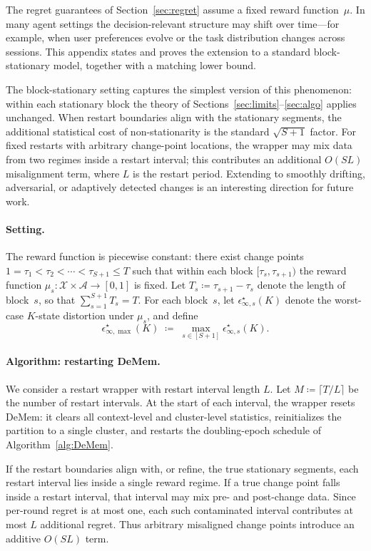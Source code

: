 \documentclass{article}
\theoremstyle{plain}
\theoremstyle{definition}
\theoremstyle{remark}
\newcommand{\cA}{\mathcal{A}}
\newcommand{\cX}{\mathcal{X}}
\newcommand{\eps}{\epsilon}
\begin{document}
The regret guarantees of Section~\ref{sec:regret} assume a fixed reward
function~$\mu$.
In many agent settings the decision-relevant structure may shift over
time---for example, when user preferences evolve or the task distribution
changes across sessions.
This appendix states and proves the extension to a standard block-stationary
model, together with a matching lower bound.

The block-stationary setting captures the simplest version of this phenomenon:
within each stationary block the theory of
Sections~\ref{sec:limits}--\ref{sec:algo} applies unchanged.
When restart boundaries align with the stationary segments, the additional
statistical cost of non-stationarity is the standard \(\sqrt{S+1}\) factor.
For fixed restarts with arbitrary change-point locations, the wrapper may mix
data from two regimes inside a restart interval; this contributes an
additional \(O(SL)\) misalignment term, where \(L\) is the restart period.
Extending to smoothly drifting, adversarial, or adaptively detected changes
is an interesting direction for future work.

\paragraph{Setting.}
The reward function is piecewise constant: there exist change points
$1=\tau_1<\tau_2<\cdots<\tau_{S+1}\le T$ such that within each block
$[\tau_s,\tau_{s+1})$ the reward function
$\mu_s:\cX\times\cA\to[0,1]$ is fixed.
Let $T_s\coloneqq\tau_{s+1}-\tau_s$ denote the length of block~$s$, so that
$\sum_{s=1}^{S+1}T_s=T$.
For each block~$s$, let $\eps^\star_{\infty,s}(K)$ denote the worst-case
$K$-state distortion under $\mu_s$, and define
\[
\eps^\star_{\infty,\max}(K)
\;\coloneqq\;
\max_{s\in[S+1]}\eps^\star_{\infty,s}(K).
\]

\paragraph{Algorithm: restarting DeMem.}
We consider a restart wrapper with restart interval length \(L\). Let
\(M\coloneqq\lceil T/L\rceil\) be the number of restart intervals. At the
start of each interval, the wrapper resets DeMem: it clears all
context-level and cluster-level statistics, reinitializes the partition to a
single cluster, and restarts the doubling-epoch schedule of
Algorithm~\ref{alg:DeMem}.

If the restart boundaries align with, or refine, the true stationary
segments, each restart interval lies inside a single reward regime. If a
true change point falls inside a restart interval, that interval may mix
pre- and post-change data. Since per-round regret is at most one, each such
contaminated interval contributes at most \(L\) additional regret. Thus
arbitrary misaligned change points introduce an additive \(O(SL)\) term.
\end{document}
